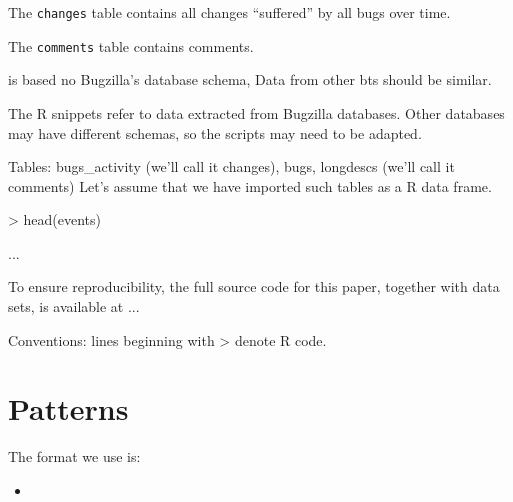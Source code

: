 The {\tt changes} table contains all changes ``suffered'' by all bugs over time.

The {\tt comments} table contains comments.


is based no Bugzilla's database schema, 
Data from other bts should be similar. 

The R snippets refer to data extracted from Bugzilla databases. Other databases may have different schemas, so the scripts may need to be adapted.

Tables: bugs\_activity (we'll call it changes), bugs, longdescs (we'll call it comments)
Let's assume that we have imported such tables as a R data frame.

> head(events)

...

To ensure reproducibility, the full source code for this paper, together with data sets, is available at ...

Conventions: lines beginning with > denote R code.

\section{Patterns}

The format we use is:

\begin{itemize}
  \item  
\end{itemize}


